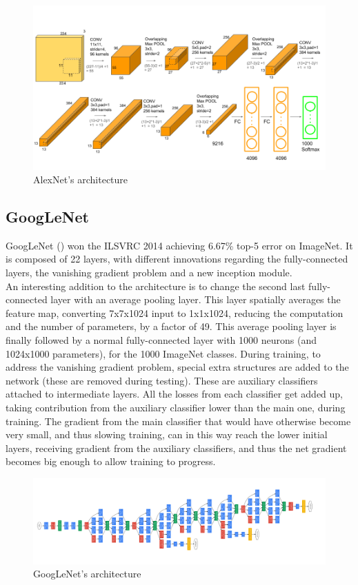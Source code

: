 \documentclass{article}
\begin{document}
\begin{figure}[h]
	\centering
	\includegraphics[width=0.7\linewidth]{image/AlexNet}
	\caption{AlexNet's architecture}
	\label{fig:alexnet}
\end{figure}
\newpage
\subsection{GoogLeNet}
GoogLeNet (\cite{googlenet}) won the ILSVRC 2014 achieving 6.67\% top-5 error on ImageNet. It is composed of 22 layers, with different innovations regarding the fully-connected layers, the vanishing gradient problem and a new inception module.\\
An interesting addition to the architecture is to change the second last fully-connected layer with an average pooling layer. This layer spatially averages the feature map, converting 7x7x1024 input to 1x1x1024, reducing the computation and the number of parameters, by a factor of 49. This average pooling layer is finally followed by a normal fully-connected layer with 1000 neurons (and 1024x1000 parameters), for the 1000 ImageNet classes.
During training, to address the vanishing gradient problem, special extra structures are added to the network (these are removed during testing). These are auxiliary classifiers attached to intermediate layers. All the losses from each classifier get added up, taking contribution from the auxiliary classifier lower than the main one, during training. The gradient from the main classifier that would have otherwise become very small, and thus slowing training, can in this way reach the lower initial layers, receiving gradient from the auxiliary classifiers, and thus the net gradient becomes big enough to allow training to progress.
\begin{figure}[h]
	\centering
	\includegraphics[width=0.7\linewidth]{image/GoogLeNet}
	\caption[]{GoogLeNet's architecture}
	\label{fig:googlenet}
\end{figure}
\end{document}

